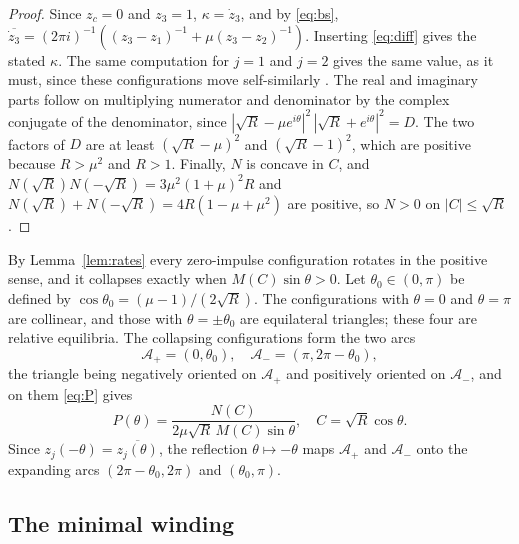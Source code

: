 \documentclass[11pt]{article}
\theoremstyle{definition}
\newcommand{\Ap}{\mathcal{A}_+}
\newcommand{\Am}{\mathcal{A}_-}
\begin{document}
\begin{proof}
Since $z_c = 0$ and $z_3 = 1$, $\kappa = \dot z_3$, and by \eqref{eq:bs}, $\overline{\dot z_3} = (2\pi i)^{-1} ((z_3 - z_1)^{-1} + \mu (z_3 - z_2)^{-1})$. Inserting \eqref{eq:diff} gives the stated $\kappa$. The same computation for $j = 1$ and $j = 2$ gives the same value, as it must, since these configurations move self-similarly \cite{kimura1987,ks2018}. The real and imaginary parts follow on multiplying numerator and denominator by the complex conjugate of the denominator, since $|\sqrt{R} - \mu e^{i\theta}|^2 \, |\sqrt{R} + e^{i\theta}|^2 = D$. The two factors of $D$ are at least $(\sqrt{R} - \mu)^2$ and $(\sqrt{R} - 1)^2$, which are positive because $R > \mu^2$ and $R > 1$. Finally, $N$ is concave in $C$, and $N(\sqrt{R}) N(-\sqrt{R}) = 3\mu^2 (1 + \mu)^2 R$ and $N(\sqrt{R}) + N(-\sqrt{R}) = 4R(1 - \mu + \mu^2)$ are positive, so $N > 0$ on $|C| \le \sqrt{R}$.
\end{proof}

By Lemma~\ref{lem:rates} every zero-impulse configuration rotates in the positive sense, and it collapses exactly when $M(C) \sin\theta > 0$. Let $\theta_0 \in (0, \pi)$ be defined by $\cos\theta_0 = (\mu - 1)/(2\sqrt{R})$. The configurations with $\theta = 0$ and $\theta = \pi$ are collinear, and those with $\theta = \pm\theta_0$ are equilateral triangles; these four are relative equilibria. The collapsing configurations form the two arcs
\[
  \Ap = (0, \theta_0), \quad \Am = (\pi, 2\pi - \theta_0),
\]
the triangle being negatively oriented on $\Ap$ and positively oriented on $\Am$, and on them \eqref{eq:P} gives
\begin{equation}\label{eq:Ptheta}
  P(\theta) = \frac{N(C)}{2\mu\sqrt{R}\, M(C) \sin\theta}, \quad C = \sqrt{R}\cos\theta.
\end{equation}
Since $z_j(-\theta) = \overline{z_j(\theta)}$, the reflection $\theta \mapsto -\theta$ maps $\Ap$ and $\Am$ onto the expanding arcs $(2\pi - \theta_0, 2\pi)$ and $(\theta_0, \pi)$.

\subsection{The minimal winding}
\end{document}
